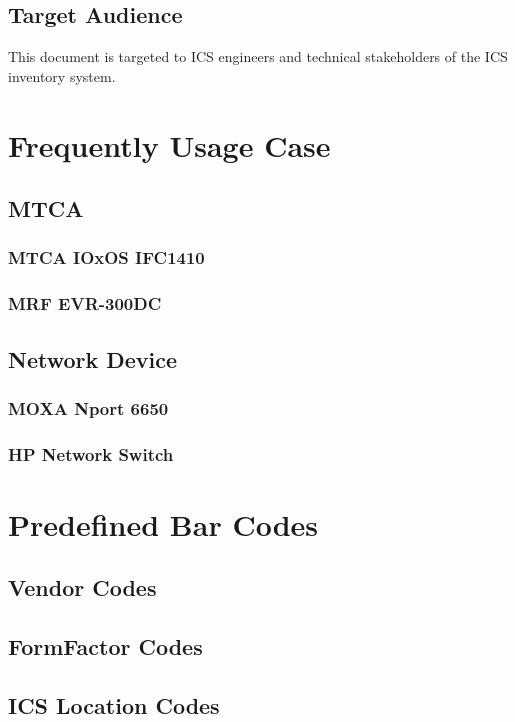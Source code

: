 \documentclass[11pt
  , a4paper
  , article
  , oneside
  , showtrims
]{memoir}
\begin{document}
\section{Target Audience}
This document is targeted to ICS engineers and technical stakeholders of the ICS inventory system. 

\chapter{Frequently Usage Case}
\section{MTCA}
\subsection{MTCA IOxOS IFC1410}
\subsection{MRF EVR-300DC}

\section{Network Device}
\subsection{MOXA Nport 6650}
\subsection{HP Network Switch}

\newpage
\chapter{Predefined Bar Codes}
\section{Vendor Codes}
\vspace{1cm}


\newpage
\section{FormFactor Codes}
\vspace{1cm}


\newpage
\section{ICS Location Codes}
\vspace{1cm}

\end{document}
